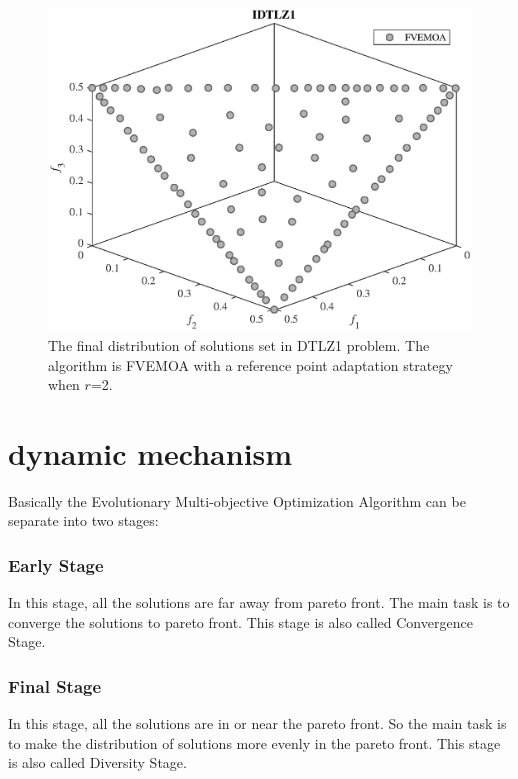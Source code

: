 \documentclass[conference]{IEEEtran}
\begin{document}
\begin{figure}[!t]
  \centering
  \includegraphics[width=\columnwidth]{FVEMOA_IDTLZ1}
  \caption{The final distribution of solutions set in DTLZ1 problem.
   The algorithm is FVEMOA with a reference point adaptation strategy when $r$=2.}
  \label{rpa3}
\end{figure}

%
% 
\section{dynamic mechanism}
Basically the Evolutionary Multi-objective Optimization Algorithm can be separate into
two stages:
\subsubsection{Early Stage} In this stage, 
all the solutions are far away from pareto front.
The main task is to converge the solutions to pareto front.
This stage is also called Convergence Stage.
\subsubsection{Final Stage} In this stage,
all the solutions are in or near the pareto front.
So the main task is to make the distribution of solutions more evenly in the pareto front.
This stage is also called Diversity Stage.
\end{document}
